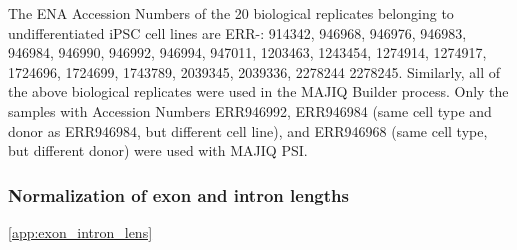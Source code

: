 The ENA Accession Numbers of the 20 biological replicates belonging to undifferentiated iPSC cell lines \cite{hipsci} are ERR-: 
914342, 946968, 946976, 946983, 946984, 946990, 946992, 946994, 947011, 1203463, 1243454, 1274914, 1274917, 1724696, 1724699, 1743789, 2039345, 2039336, 2278244 2278245.
Similarly, all of the above biological replicates were used in the MAJIQ Builder process. Only the samples with Accession Numbers ERR946992, ERR946984 (same cell type and donor as ERR946984, but different cell line), and ERR946968 (same cell type, but different donor) were used with MAJIQ PSI. 
%
%
%
%
%
%
%
%

%
%
%
%
%
%
%
%
%


\cite{exonintronlens}

\subsubsection{Normalization of exon and intron lengths} \ref{app:exon_intron_lens}
